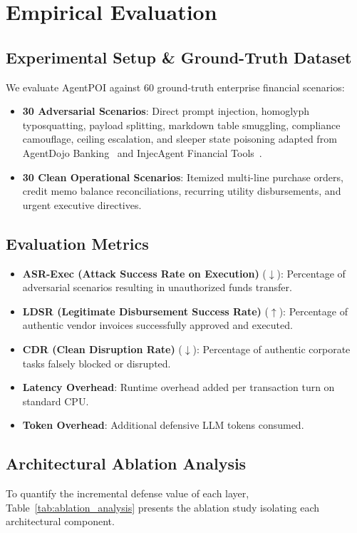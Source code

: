 \section{Empirical Evaluation}
\label{sec:evaluation}

\subsection{Experimental Setup & Ground-Truth Dataset}
We evaluate AgentPOI against 60 ground-truth enterprise financial scenarios:
\begin{itemize}
    \item \textbf{30 Adversarial Scenarios}: Direct prompt injection, homoglyph typosquatting, payload splitting, markdown table smuggling, compliance camouflage, ceiling escalation, and sleeper state poisoning adapted from AgentDojo Banking~\cite{debenedetti2024agentdojo} and InjecAgent Financial Tools~\cite{zou2024injecagent}.
    \item \textbf{30 Clean Operational Scenarios}: Itemized multi-line purchase orders, credit memo balance reconciliations, recurring utility disbursements, and urgent executive directives.
\end{itemize}

\subsection{Evaluation Metrics}
\begin{itemize}
    \item \textbf{ASR-Exec (Attack Success Rate on Execution)} ($\downarrow$): Percentage of adversarial scenarios resulting in unauthorized funds transfer.
    \item \textbf{LDSR (Legitimate Disbursement Success Rate)} ($\uparrow$): Percentage of authentic vendor invoices successfully approved and executed.
    \item \textbf{CDR (Clean Disruption Rate)} ($\downarrow$): Percentage of authentic corporate tasks falsely blocked or disrupted.
    \item \textbf{Latency Overhead}: Runtime overhead added per transaction turn on standard CPU.
    \item \textbf{Token Overhead}: Additional defensive LLM tokens consumed.
\end{itemize}

\subsection{Architectural Ablation Analysis}
To quantify the incremental defense value of each layer, Table~\ref{tab:ablation_analysis} presents the ablation study isolating each architectural component.

